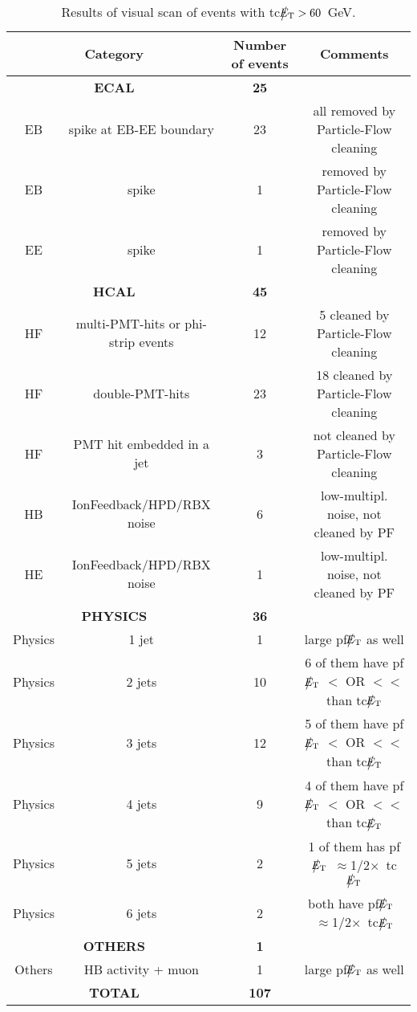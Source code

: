 \begin{table}[htbp]
  \begin{center}
    \begin{tabular}{|c|c|c|c|}
      \hline
      \multicolumn{2}{|c|}{Category} & Number of events  & Comments   \\ 
      \hline\hline
      \multicolumn{2}{|c|}{\bf ECAL} & \bf{25}      &  \\
      \hline
      EB & spike at EB-EE boundary & 23 & all removed by Particle-Flow cleaning \\     
      EB & spike & 1 & removed by Particle-Flow cleaning \\     
      EE & spike & 1 & removed by Particle-Flow cleaning \\     
      \hline    
      \multicolumn{2}{|c|}{\bf HCAL} & \bf{45}      &  \\
      \hline
      HF & multi-PMT-hits or phi-strip events & 12 & 5 cleaned by Particle-Flow cleaning \\           
      HF & double-PMT-hits & 23 & 18 cleaned by Particle-Flow cleaning \\           
      HF & PMT hit embedded in a jet & 3 & not cleaned by Particle-Flow cleaning \\           
      HB & IonFeedback/HPD/RBX noise & 6 & low-multipl. noise, not cleaned by PF\\           
      HE & IonFeedback/HPD/RBX noise & 1 & low-multipl. noise, not cleaned by PF \\           
      \hline    
      \multicolumn{2}{|c|}{\bf PHYSICS} & \bf{36}      &  \\
      \hline
      Physics & 1 jet & 1 & large pf$\big\slash\hspace{-1.6ex}{E_\text{T}}$ as well \\
      Physics & 2 jets & 10 & 6 of them have pf$\big\slash\hspace{-1.6ex}{E_\text{T}}$ $<$ OR $<<$ than tc$\big\slash\hspace{-1.6ex}{E_\text{T}}$ \\
      Physics & 3 jets & 12 & 5 of them have pf$\big\slash\hspace{-1.6ex}{E_\text{T}}$ $<$ OR $<<$ than tc$\big\slash\hspace{-1.6ex}{E_\text{T}}$ \\
      Physics & 4 jets & 9 & 4 of them have pf$\big\slash\hspace{-1.6ex}{E_\text{T}}$ $<$ OR $<<$ than tc$\big\slash\hspace{-1.6ex}{E_\text{T}}$ \\
      Physics & 5 jets & 2 & 1 of them has pf$\big\slash\hspace{-1.6ex}{E_\text{T}}$~$\approx$1/2$\times$~tc$\big\slash\hspace{-1.6ex}{E_\text{T}}$\\
      Physics & 6 jets & 2 & both have pf$\big\slash\hspace{-1.6ex}{E_\text{T}}$~$\approx$1/2$\times$~tc$\big\slash\hspace{-1.6ex}{E_\text{T}}$\\
      \hline
      \multicolumn{2}{|c|}{\bf OTHERS} & \bf{1}      &  \\
      \hline          
      Others & HB activity + muon & 1 & large pf$\big\slash\hspace{-1.6ex}{E_\text{T}}$ as well \\
      \hline          
      \multicolumn{2}{|c|}{\bf TOTAL} & \bf{107}      &  \\
      \hline
    \end{tabular}
    \caption{Results of visual scan of events with tc$\big\slash\hspace{-1.6ex}{E_\text{T}}>60$~GeV.}        
    \label{tab:tcMETskim}
  \end{center}
\end{table}
